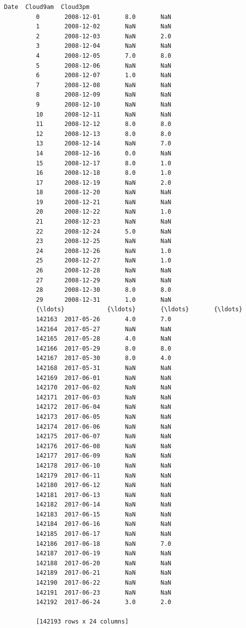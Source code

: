 \documentclass[11pt]{article}
\begin{document}
\begin{Verbatim}[commandchars=\\\{\}]
                       Date  Cloud9am  Cloud3pm  
         0       2008-12-01       8.0       NaN  
         1       2008-12-02       NaN       NaN  
         2       2008-12-03       NaN       2.0  
         3       2008-12-04       NaN       NaN  
         4       2008-12-05       7.0       8.0  
         5       2008-12-06       NaN       NaN  
         6       2008-12-07       1.0       NaN  
         7       2008-12-08       NaN       NaN  
         8       2008-12-09       NaN       NaN  
         9       2008-12-10       NaN       NaN  
         10      2008-12-11       NaN       NaN  
         11      2008-12-12       8.0       8.0  
         12      2008-12-13       8.0       8.0  
         13      2008-12-14       NaN       7.0  
         14      2008-12-16       0.0       NaN  
         15      2008-12-17       8.0       1.0  
         16      2008-12-18       8.0       1.0  
         17      2008-12-19       NaN       2.0  
         18      2008-12-20       NaN       NaN  
         19      2008-12-21       NaN       NaN  
         20      2008-12-22       NaN       1.0  
         21      2008-12-23       NaN       NaN  
         22      2008-12-24       5.0       NaN  
         23      2008-12-25       NaN       NaN  
         24      2008-12-26       NaN       1.0  
         25      2008-12-27       NaN       1.0  
         26      2008-12-28       NaN       NaN  
         27      2008-12-29       NaN       NaN  
         28      2008-12-30       8.0       8.0  
         29      2008-12-31       1.0       NaN  
         {\ldots}            {\ldots}       {\ldots}       {\ldots}  
         142163  2017-05-26       4.0       7.0  
         142164  2017-05-27       NaN       NaN  
         142165  2017-05-28       4.0       NaN  
         142166  2017-05-29       8.0       8.0  
         142167  2017-05-30       8.0       4.0  
         142168  2017-05-31       NaN       NaN  
         142169  2017-06-01       NaN       NaN  
         142170  2017-06-02       NaN       NaN  
         142171  2017-06-03       NaN       NaN  
         142172  2017-06-04       NaN       NaN  
         142173  2017-06-05       NaN       NaN  
         142174  2017-06-06       NaN       NaN  
         142175  2017-06-07       NaN       NaN  
         142176  2017-06-08       NaN       NaN  
         142177  2017-06-09       NaN       NaN  
         142178  2017-06-10       NaN       NaN  
         142179  2017-06-11       NaN       NaN  
         142180  2017-06-12       NaN       NaN  
         142181  2017-06-13       NaN       NaN  
         142182  2017-06-14       NaN       NaN  
         142183  2017-06-15       NaN       NaN  
         142184  2017-06-16       NaN       NaN  
         142185  2017-06-17       NaN       NaN  
         142186  2017-06-18       NaN       7.0  
         142187  2017-06-19       NaN       NaN  
         142188  2017-06-20       NaN       NaN  
         142189  2017-06-21       NaN       NaN  
         142190  2017-06-22       NaN       NaN  
         142191  2017-06-23       NaN       NaN  
         142192  2017-06-24       3.0       2.0  
         
         [142193 rows x 24 columns]
\end{Verbatim}
            
\end{document}
